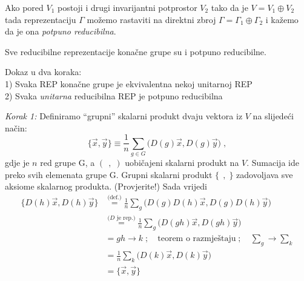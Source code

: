 \begin{definicija}
Ako pored $V_1$ postoji i drugi invarijantni potprostor $V_2$ 
tako da je $V=V_1 \oplus V_2$ tada reprezentaciju $\Gamma$
možemo rastaviti na direktni zbroj $\Gamma=\Gamma_1
\oplus \Gamma_2$ i kažemo da je ona \emph{potpuno reducibilna}.
\end{definicija}


\begin{teorem}[Maschke]
Sve reducibilne reprezentacije konačne grupe su i potpuno
reducibilne.
\end{teorem}

Dokaz u dva koraka:\\
1) Svaka REP konačne grupe je ekvivalentna nekoj unitarnoj REP\\
2) Svaka \emph{unitarna} reducibilna REP je potpuno reducibilna


\emph{Korak 1:} Definiramo ``grupni'' skalarni produkt dvaju
vektora iz $V$ na slijedeći način:
\begin{equation*}
\{\vec{x}, \vec{y}\} \equiv \frac{1}{n}\sum_{g\in G} \big( D(g)\vec{x},
 D(g)\vec{y}\big) \;, 
\end{equation*}
gdje je $n$ red grupe G, a $(\;\,,\;)$ uobičajeni skalarni produkt na $V$.
Sumacija ide preko svih elemenata grupe G.
Grupni skalarni produkt $\{\;\,,\;\}$ zadovoljava sve aksiome skalarnog
produkta. (Provjerite!)
Sada vrijedi
\begin{equation*}
\begin{split}
\{D(h)\vec{x}, D(h)\vec{y}\} &\stackrel{\text{(def.)}}{=} \frac{1}{n}\sum_g \big( D(g) D(h) \vec{x},
 D(g) D(h) \vec{y} \big) \\
&\stackrel{\text{($D$ je rep.)}}= \frac{1}{n}\sum_g \big( D(gh)\vec{x} , D(gh)\vec{y} \big) \\
&=  gh\to k\;;\quad \text{teorem o razmještaju}\;;\quad \sum_g \to \sum_k \\
&= \frac{1}{n}\sum_k \big( D(k) \vec{x}, D(k) \vec{y} \big) \\
&= \{\vec{x}, \vec{y}\} 
\end{split}
\end{equation*}

